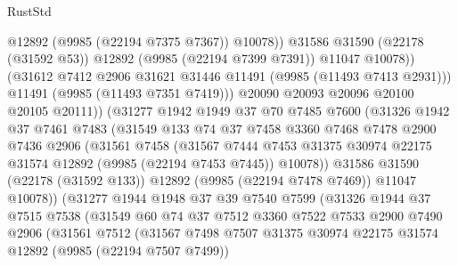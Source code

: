\begin{lexlean}{RustStd}
\begin{coremodule}
                          @12892
                          (@9985 (@22194 @7375 @7367))
                          @10078))
                      @31586
                      @31590
                      (@22178 (@31592 @53))
                      @12892
                      (@9985 (@22194 @7399 @7391))
                      @11047
                      @10078))
                  (@31612 @7412 @2906 @31621 @31446 @11491 (@9985 (@11493 @7413 @2931)))
                  @11491
                  (@9985 (@11493 @7351 @7419)))
                @20090
                @20093
                @20096
                @20100
                @20105
                @20111))
            (@31277
              @1942
              @1949
              @37
              @70
              @7485
              @7600
              (@31326
                @1942
                @37
                @7461
                @7483
                (@31549
                  @133
                  @74
                  @37
                  @7458
                  @3360
                  @7468
                  @7478
                  @2900
                  @7436
                  @2906
                  (@31561
                    @7458
                    (@31567
                      @7444
                      @7453
                      @31375
                      @30974
                      @22175
                      @31574
                      @12892
                      (@9985 (@22194 @7453 @7445))
                      @10078))
                  @31586
                  @31590
                  (@22178 (@31592 @133))
                  @12892
                  (@9985 (@22194 @7478 @7469))
                  @11047
                  @10078))
              (@31277
                @1944
                @1948
                @37
                @39
                @7540
                @7599
                (@31326
                  @1944
                  @37
                  @7515
                  @7538
                  (@31549
                    @60
                    @74
                    @37
                    @7512
                    @3360
                    @7522
                    @7533
                    @2900
                    @7490
                    @2906
                    (@31561
                      @7512
                      (@31567
                        @7498
                        @7507
                        @31375
                        @30974
                        @22175
                        @31574
                        @12892
                        (@9985 (@22194 @7507 @7499))

\end{coremodule}
\end{lexlean}
